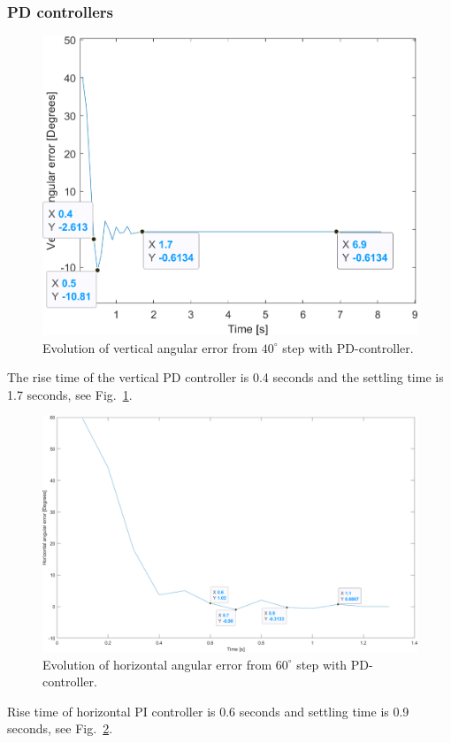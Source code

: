 \subsubsection{PD controllers}
\label{sec:simon14}
\begin{figure}[h]
\centering
\includegraphics[width=\linewidth]{sections/assets/Vertical_PD_controller.png}
\caption{Evolution of vertical angular error from \(40^{\circ}\) step with PD-controller.}
\label{vert_PD}
\end{figure}
The rise time of the vertical PD controller is 0.4 seconds and the settling time is 1.7 seconds, see Fig.~\ref{vert_PD}.
\begin{figure}[h]
\centering
\includegraphics[width=\linewidth]{sections/assets/Horizontal_PD_controller.png}
\caption{Evolution of horizontal angular error from \(60^{\circ}\) step with PD-controller.}
\label{Horizontal_PD}
\end{figure}
Rise time of horizontal PI controller is 0.6 seconds and settling time is 0.9 seconds, see Fig.~\ref{Horizontal_PD}.

